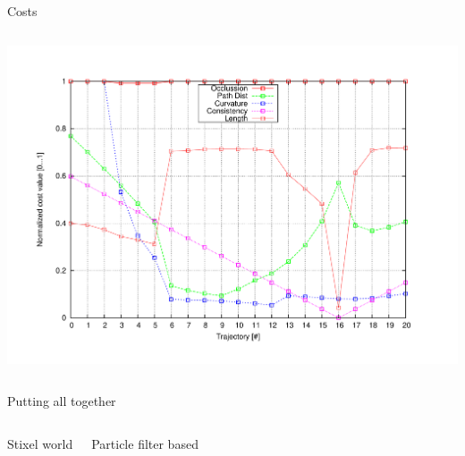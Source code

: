 \begin{frame}[plain]{Costs}
\begin{columns}
\begin{center}
      \includegraphics[width=\textwidth,trim=50 40 80 60,clip]{costs17}
    \end{center}
  \end{columns}
\end{frame}


\begin{frame}[plain]{Putting all together}
  \begin{columns}
    \begin{center}
      Stixel world\\~\\
    \end{center}
    \begin{center}
      Particle filter based\\~\\
    \end{center}
  \end{columns}
\end{frame}